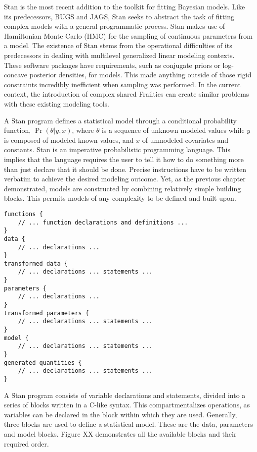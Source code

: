 Stan is the most recent addition to the toolkit for fitting Bayesian models. Like its predecessors, BUGS and JAGS, Stan seeks to abstract the task of fitting complex models with a general programmatic process. Stan makes use of Hamiltonian Monte Carlo (HMC) for the sampling of continuous parameters from a model. The existence of Stan stems from the operational difficulties of its predecessors in dealing with multilevel generalized linear modeling contexts. These software packages have requirements, such as conjugate priors or log-concave posterior densities, for models. This made anything outside of those rigid constraints incredibly inefficient when sampling was performed. In the current context, the introduction of complex shared Frailties can create similar problems with these existing modeling tools. 

A Stan program defines a statistical model through a conditional probability function, $\Pr(\theta|y,x)$, where $\theta$ is a sequence of unknown modeled values while $y$ is composed of modeled known values, and $x$ of unmodeled covariates and constants\cite{StanDevelopmentTeam2016}. Stan is an imperative probabilistic programming language. This implies that the language requires the user to tell it how to do something more than just declare that it should be done. Precise instructions have to be written verbatim to achieve the desired modeling outcome. Yet, as the previous chapter demonstrated, models are constructed by combining relatively simple building blocks. This permits models of any complexity to be defined and built upon.


\begin{lstlisting}
functions {
	// ... function declarations and definitions ...
}
data {
	// ... declarations ...
}
transformed data {
	// ... declarations ... statements ...
}
parameters {
	// ... declarations ...
}
transformed parameters {
	// ... declarations ... statements ...
}
model {
	// ... declarations ... statements ...
}
generated quantities {
	// ... declarations ... statements ...
}
\end{lstlisting}


A Stan program consists of variable declarations and statements, divided into a series of blocks written in a C-like syntax. This compartmentalizes operations, as variables can be declared in the block within which they are used. Generally, three blocks are used to define a statistical model. These are the data, parameters and model blocks. Figure XX demonstrates all the available blocks and their required order.

